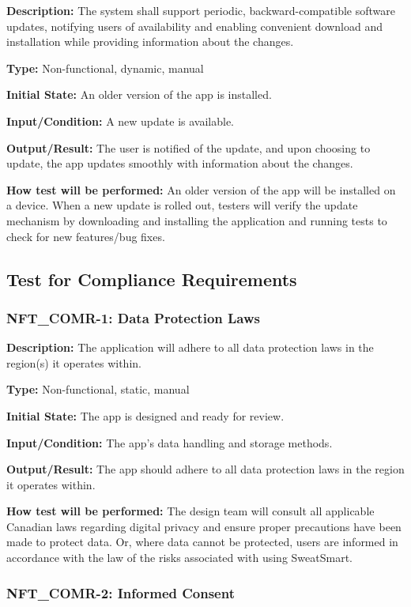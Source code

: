 \documentclass[12pt, titlepage]{article}
\begin{document}
\textbf{Description: }The system shall support periodic, backward-compatible software updates, notifying users of availability and enabling convenient download and installation while providing information about the changes.

\textbf{Type:} Non-functional, dynamic, manual

\textbf{Initial State:} An older version of the app is installed.

\textbf{Input/Condition:} A new update is available.

\textbf{Output/Result:} The user is notified of the update, and upon choosing to update, the app updates smoothly with information about the changes.

\textbf{How test will be performed:} An older version of the app will be installed on a device. When a new update is rolled out, testers will verify the update mechanism by downloading and installing the application and running tests to check for new features/bug fixes. 
\newline
\subsection{Test for Compliance Requirements}


\subsubsection*{\textbf{NFT\_COMR-1: Data Protection Laws}
}

\textbf{Description: }The application will adhere to all data protection laws in the region(s) it operates within.

\textbf{Type:} Non-functional, static, manual

\textbf{Initial State:} The app is designed and ready for review.

\textbf{Input/Condition:} The app's data handling and storage methods.

\textbf{Output/Result:} The app should adhere to all data protection laws in the region it operates within.

\textbf{How test will be performed:} The design team will consult all applicable Canadian laws regarding digital privacy and ensure proper precautions have been made to protect data. Or, where data cannot be protected, users are informed in accordance with the law of the risks associated with using SweatSmart. 


\subsubsection*{\textbf{NFT\_COMR-2: Informed Consent}
}
\end{document}
